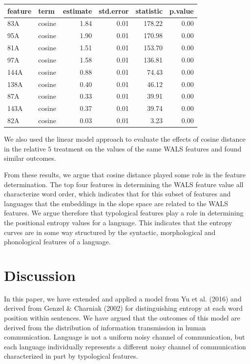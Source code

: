 \documentclass[10pt, letterpaper]{article}
\begin{document}
\begin{table}[tb]
\centering
\begin{tabular}{llrrrr}
  \hline
feature & term & estimate & std.error & statistic & p.value \\ 
  \hline
83A & cosine & 1.84 & 0.01 & 178.22 & 0.00 \\ 
  95A & cosine & 1.90 & 0.01 & 170.98 & 0.00 \\ 
  81A & cosine & 1.51 & 0.01 & 153.70 & 0.00 \\ 
  97A & cosine & 1.58 & 0.01 & 136.81 & 0.00 \\ 
  144A & cosine & 0.88 & 0.01 & 74.43 & 0.00 \\ 
  138A & cosine & 0.40 & 0.01 & 46.12 & 0.00 \\ 
  87A & cosine & 0.33 & 0.01 & 39.91 & 0.00 \\ 
  143A & cosine & 0.37 & 0.01 & 39.74 & 0.00 \\ 
  82A & cosine & 0.03 & 0.01 & 3.23 & 0.00 \\ 
   \hline
\end{tabular}
\end{table}

We also used the linear model approach to evaluate the effects of cosine
distance in the relative \(5\) treatment on the values of the same WALS
features and found similar outcomes.

From these results, we argue that cosine distance played some role in
the feature determination. The top four features in determining the WALS
feature value all characterize word order, which indicates that for this
subset of features and languages that the embeddings in the slope space
are related to the WALS features. We argue therefore that typological
features play a role in determining the positional entropy values for a
language. This indicates that the entropy curves are in some way
structured by the syntactic, morphological and phonological features of
a language.

\hypertarget{discussion}{%
\section{Discussion}\label{discussion}}

In this paper, we have extended and applied a model from Yu et al.
(2016) and derived from Genzel \& Charniak (2002) for distinguishing
entropy at each word position within sentences. We have argued that the
outcomes of this model are derived from the distribution of information
transmission in human communication. Language is not a uniform noisy
channel of communication, but each language individually represents a
different noisy channel of communication characterized in part by
typological features.
\end{document}
